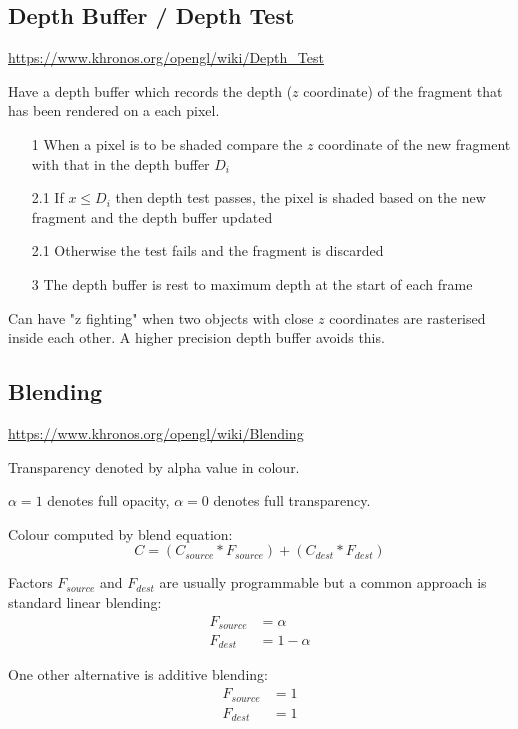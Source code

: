 \documentclass[a4paper]{article}
\begin{document}
\subsection{Depth Buffer / Depth Test}

\url{https://www.khronos.org/opengl/wiki/Depth_Test}

Have a depth buffer which records the depth ($z$ coordinate) of the fragment
that has been rendered on a each pixel.

\begin{enumerate}
  \item[1]   When a pixel is to be shaded compare the $z$ coordinate of the new
    fragment with that in the depth buffer $D_{i}$
  \item[2.1] If $x \leq D_{i}$ then depth test passes, the pixel is shaded based
    on the new fragment and the depth buffer updated
  \item[2.1] Otherwise the test fails and the fragment is discarded
  \item[3]   The depth buffer is rest to maximum depth at the start of each
    frame
\end{enumerate}

Can have "z fighting" when two objects with close $z$ coordinates are rasterised
inside each other. A higher precision depth buffer avoids this.

\subsection{Blending}

\url{https://www.khronos.org/opengl/wiki/Blending}

Transparency denoted by alpha value in colour.

$\alpha = 1$ denotes full opacity, $\alpha = 0$ denotes full transparency.

Colour computed by blend equation:
\[
  C = (C_{source} * F_{source}) + (C_{dest} * F_{dest})
\]

Factors $F_{source}$ and $F_{dest}$ are usually programmable but a common
approach is standard linear blending:
\begin{align*}
  F_{source} &= \alpha \\
  F_{dest} &= 1 - \alpha
\end{align*}

One other alternative is additive blending:
\begin{align*}
  F_{source} &= 1 \\
  F_{dest} &= 1
\end{align*}
\end{document}
